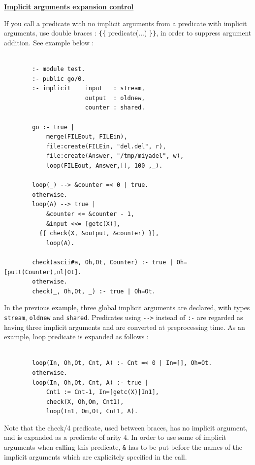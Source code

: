 \noindent\underline{\bf Implicit arguments expansion control}
 \vspace{1ex}\par
If you call a predicate with no implicit arguments from a predicate with
implicit arguments, use double braces : \verb|{{| predicate(...) \verb|}}|,
in order to suppress argument addition. See example below :
\begin{verbatim}

        :- module test.
        :- public go/0.
        :- implicit    input   : stream,
                       output  : oldnew,
                       counter : shared.

        go :- true |
            merge(FILEout, FILEin),
            file:create(FILEin, "del.del", r),
            file:create(Answer, "/tmp/miyadel", w),
            loop(FILEout, Answer,[], 100 ,_).

        loop(_) --> &counter =< 0 | true.
        otherwise.
        loop(A) --> true |
            &counter <= &counter - 1,
            &input <<= [getc(X)],
          {{ check(X, &output, &counter) }},
            loop(A).

        check(ascii#a, Oh,Ot, Counter) :- true | Oh=[putt(Counter),nl|Ot].
        otherwise.
        check(_, Oh,Ot, _) :- true | Oh=Ot.

\end{verbatim}
In the previous example, three global implicit arguments are declared,
with types \verb|stream|, \verb|oldnew| and \verb|shared|.
Predicates using \verb|-->| instead of \verb|:-| are
regarded as having three implicit arguments and are converted at
preprocessing time. As an example, loop predicate is expanded as follows :
\begin{verbatim}

        loop(In, Oh,Ot, Cnt, A) :- Cnt =< 0 | In=[], Oh=Ot.
        otherwise.
        loop(In, Oh,Ot, Cnt, A) :- true |
            Cnt1 := Cnt-1, In=[getc(X)|In1],
            check(X, Oh,Om, Cnt1),
            loop(In1, Om,Ot, Cnt1, A).

\end{verbatim}
Note that the check/4 predicate, used between braces, has no implicit argument,
and is expanded as a predicate of arity 4. In order to use some of implicit
arguments when calling this predicate, \verb|&| has to be put before the names
of the implicit arguments which are explicitely specified in the call.
\vspace{2ex}

